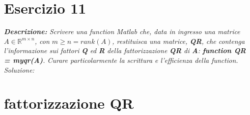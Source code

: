 \section{Esercizio 11}
\textit{\textbf{Descrizione:} Scrivere una function Matlab che, data in ingresso una matrice $A \in \mathbb{R}^{m\times n}$, con $m \geq n = rank(A)$, restituisca una matrice, \textbf{QR}, che contenga l'informazione sui fattori \textbf{Q} ed \textbf{R} della fattorizzazione \textbf{QR} di \textbf{A}: \textbf{function QR = myqr(A)}. Curare particolarmente la scrittura e l'efficienza della function.}\newline
\noindent\emph{Soluzione: }\newline

\section*{fattorizzazione QR}

\newpage
